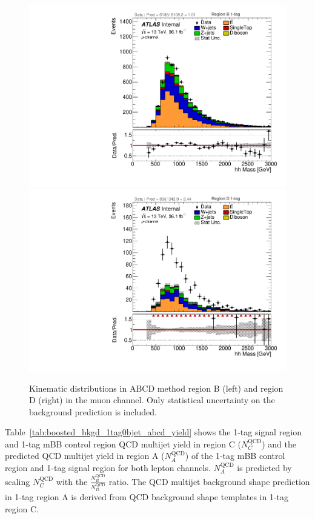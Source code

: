 \begin{figure}[!htbp]
\begin{center}
\includegraphics[scale=0.33]{./figures/boosted/ABCD_1tag0bjet/muon_Inc_RegionB_hhMass}  
\includegraphics[scale=0.33]{./figures/boosted/ABCD_1tag0bjet/muon_Inc_RegionD_hhMass}   
\caption{Kinematic distributions in ABCD method region B (left) and region D (right) in the muon channel.
Only statistical uncertainty on the background prediction is included.}
\label{fig:boosted_abcd_1tag0bjet_region_bd_muon}
\end{center}
\end{figure}

Table~\ref{tab:boosted_bkgd_1tag0bjet_abcd_yield} shows the 1-tag signal region and 1-tag mBB control region QCD 
multijet yield in region C ($N_C^\text{QCD}$) and the predicted QCD multijet yield in region A ($N_A^\text{QCD}$) 
of the 1-tag mBB control region and 1-tag signal region for both lepton channels. $N_A^\text{QCD}$ is predicted by 
scaling $N_C^\text{QCD}$ with the $\frac{N_B^\text{QCD}}{N_D^\text{QCD}}$ ratio. The QCD multijet background shape 
prediction in 1-tag region A is derived from QCD background shape templates in 1-tag region C.

